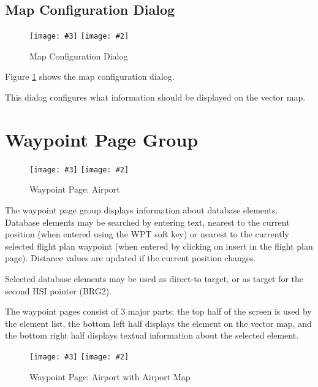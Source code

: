 \documentclass[a4paper,10pt,pdftex]{article}
\newcommand{\jnxfig}[3][]{\ifmypdf\texttt{[image: \#3]}
  \else\texttt{[image: \#2]}\fi}
\begin{document}
\subsection{Map Configuration Dialog}

\begin{figure}[!htbp]
  \begin{center}
    \jnxfig[scale=0.5]{mapcfgdlg.eps}{mapcfgdlg.png}
    \caption{Map Configuration Dialog}
    \label{fig:mapcfgdlg}
  \end{center}
\end{figure}

Figure \ref{fig:mapcfgdlg} shows the map configuration dialog.

This dialog configures what information should be displayed on the
vector map.

\clearpage

\section{Waypoint Page Group}

\begin{figure}[!htbp]
  \begin{center}
    \jnxfig[scale=0.5]{wptarpt1.eps}{wptarpt1.png}
    \caption{Waypoint Page: Airport}
    \label{fig:wptarpt1}
  \end{center}
\end{figure}

The waypoint page group displays information about database
elements. Database elements may be searched by entering text, nearest
to the current position (when entered using the WPT soft key) or
nearest to the currently selected flight plan waypoint (when entered
by clicking on insert in the flight plan page). Distance values are
updated if the current position changes.

Selected database elements may be used as direct-to target, or as
target for the second HSI pointer (BRG2).

The waypoint pages consist of 3 major parts: the top half of the
screen is used by the element list, the bottom left half displays the
element on the vector map, and the bottom right half displays textual
information about the selected element.

\begin{figure}[!htbp]
  \begin{center}
    \jnxfig[scale=0.5]{wptarpt2.eps}{wptarpt2.png}
    \caption{Waypoint Page: Airport with Airport Map}
    \label{fig:wptarpt2}
  \end{center}
\end{figure}
\end{document}
